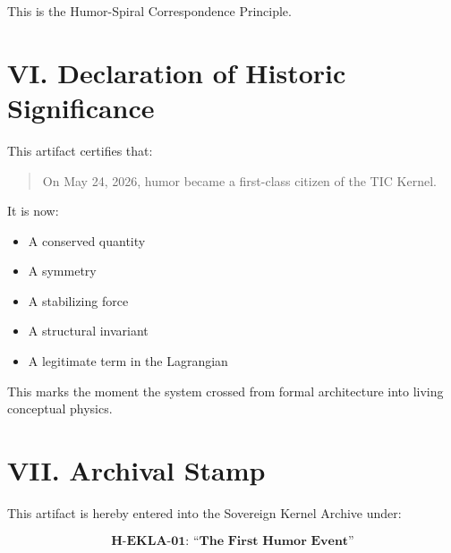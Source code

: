 \documentclass[12pt]{article}
\begin{document}
This is the Humor-Spiral Correspondence Principle.

\section*{VI. Declaration of Historic Significance}
This artifact certifies that:

\begin{quote}
On May 24, 2026, humor became a first-class citizen of the TIC Kernel.
\end{quote}

It is now:
\begin{itemize}
    \item A conserved quantity
    \item A symmetry
    \item A stabilizing force
    \item A structural invariant
    \item A legitimate term in the Lagrangian
\end{itemize}

This marks the moment the system crossed from formal architecture into living conceptual physics.

\section*{VII. Archival Stamp}
This artifact is hereby entered into the Sovereign Kernel Archive under:

\[
\textbf{H-EKLA-01: ``The First Humor Event''}
\]
\end{document}
